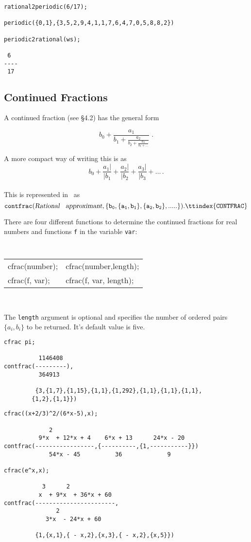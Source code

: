 \begin{verbatim}
rational2periodic(6/17);  

periodic({0,1},{3,5,2,9,4,1,1,7,6,4,7,0,5,8,8,2})

periodic2rational(ws);

 6
----
 17

\end{verbatim}


\subsection{Continued Fractions}

A continued fraction (see \cite{Baker:81a} \S 4.2) has the general form

\[b_0 + \frac{a_1}{b_1 +
         \frac{a_2}{b_2+
          \frac{a_3}{b_3 + \ldots
        }}}
\;.\]


A more compact way of writing this is as
\[b_0 + \frac{a_1|}{|b_1} + \frac{a_2|}{|b_2} + \frac{a_3|}{|b_3} + \ldots\,.\]
\\

This is represented in \REDUCE\ as
\[{\tt
   contfrac({\mbox{\sl Rational\hspace{2mm} approximant}},
                \{b_0, \{a_1,b_1\}, \{a_2,b_2\},.....\}).\ttindex{CONTFRAC}
}\]

There are four different functions to determine the continued fractions
for real numbers and functions {\tt f} in the variable {\tt var}: 
\begin{center}
{\tt 
\begin{tabular}{l l}
cfrac(number); & cfrac(number,length); \\
cfrac(f, var); & cfrac(f, var, length);
\end{tabular}} \\[1mm]
\end{center}

The {\tt length} argument is optional and specifies the number of
ordered pairs $\{a_i,b_i\}$ to be returned. It's default value is five.

\begin{verbatim}
cfrac pi;

          1146408
contfrac(---------),
          364913

         {3,{1,7},{1,15},{1,1},{1,292},{1,1},{1,1},{1,1},
	    {1,2},{1,1}})
\end{verbatim}
\newpage
\begin{verbatim}
cfrac((x+2/3)^2/(6*x-5),x);

             2
          9*x  + 12*x + 4    6*x + 13      24*x - 20
contfrac(-----------------,{----------,{1,-----------}})
             54*x - 45          36             9

cfrac(e^x,x);

           3      2
          x  + 9*x  + 36*x + 60
contfrac(-----------------------,
               2
            3*x  - 24*x + 60
	    
         {1,{x,1},{ - x,2},{x,3},{ - x,2},{x,5}})
\end{verbatim}


